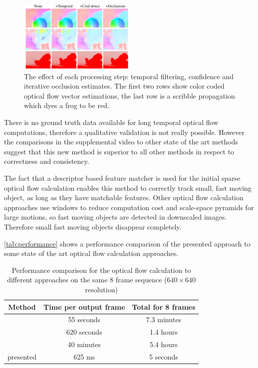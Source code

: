 \begin{figure}[htb]
  \centering
  \includegraphics[width=0.5\textwidth]{images/improvements.png}
  \caption{The effect of each processing step: temporal filtering, confidence
  and iterative occlusion estimates. The first two rows show color coded optical flow
vector estimations, the last row is a scribble propagation which dyes a frog to be red.}
  \label{fig:improvements}
\end{figure}

There is no ground truth data available for long temporal optical flow
computations, therefore a qualitative validation is not really possible. However
the comparisons in the supplemental video to other state of the art methods
suggest that this new method is superior to all other methods in respect to
correctness and consistency.

The fact that a descriptor based feature matcher is used for the initial sparse
optical flow calculation enables this method to correctly track small, fast
moving object, as long as they have matchable features. Other optical flow
calculation approaches use windows to reduce computation cost and scale-space
pyramids for large motions, so fast moving objects are detected in downscaled
images. Therefore small fast moving objects disappear completely.

\autoref{tab:performance} shows a performance comparison of the presented
approach to some state of the art optical flow calculation approaches.
\begin{table}[htb]
  \centering
  {\footnotesize
  \begin{tabular}{|c|cc|}
    \hline
    Method & Time per output frame & Total for 8 frames\\
    \hline \hline
    \cite{Rhemann:2011:FCF:2191740.2191908} & 55 seconds & 7.3 minutes\\
    \cite{Zimmer:2011:OFH:1969654.1969711} & 620 seconds & 1.4 hours\\
    \cite{conf/iccv/VolzBVZ11} & 40 minutes & 5.4 hours\\
    presented& 625 ms & 5 seconds\\ \hline
  \end{tabular}}
  \caption{Performance comparison for the optical flow calculation to different
  approaches on the same 8 frame sequence ($640\times640$ resolution)}
  \label{tab:performance}
\end{table}

